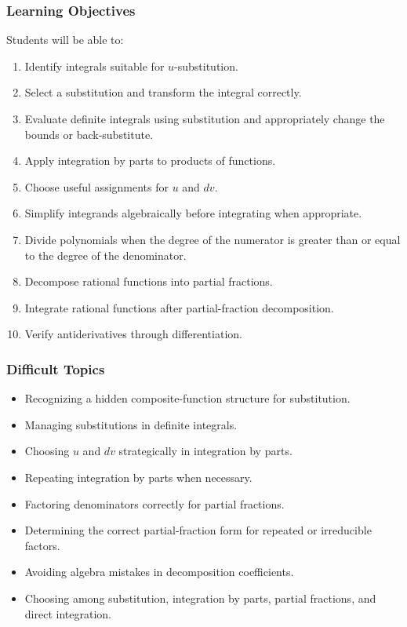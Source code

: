 \documentclass[11pt]{article}
\begin{document}
\subsubsection{Learning Objectives}

Students will be able to:

\begin{enumerate}
    \item Identify integrals suitable for $u$-substitution.
    \item Select a substitution and transform the integral correctly.
    \item Evaluate definite integrals using substitution and appropriately change the bounds or back-substitute.
    \item Apply integration by parts to products of functions.
    \item Choose useful assignments for $u$ and $dv$.
    \item Simplify integrands algebraically before integrating when appropriate.
    \item Divide polynomials when the degree of the numerator is greater than or equal to the degree of the denominator.
    \item Decompose rational functions into partial fractions.
    \item Integrate rational functions after partial-fraction decomposition.
    \item Verify antiderivatives through differentiation.
\end{enumerate}

\subsubsection{Difficult Topics}

\begin{itemize}
    \item Recognizing a hidden composite-function structure for substitution.
    \item Managing substitutions in definite integrals.
    \item Choosing $u$ and $dv$ strategically in integration by parts.
    \item Repeating integration by parts when necessary.
    \item Factoring denominators correctly for partial fractions.
    \item Determining the correct partial-fraction form for repeated or irreducible factors.
    \item Avoiding algebra mistakes in decomposition coefficients.
    \item Choosing among substitution, integration by parts, partial fractions, and direct integration.
\end{itemize}
\end{document}

